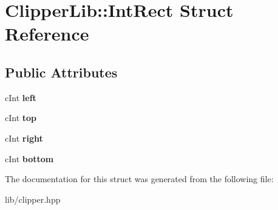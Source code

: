 \hypertarget{struct_clipper_lib_1_1_int_rect}{}\section{Clipper\+Lib\+:\+:Int\+Rect Struct Reference}
\label{struct_clipper_lib_1_1_int_rect}
\subsection*{Public Attributes}
\begin{DoxyCompactItemize}
\item 
\mbox{\label{struct_clipper_lib_1_1_int_rect_a9bf519994ffc7d1d5752fb1e2411b4cd}} 
c\+Int {\bfseries left}
\item 
\mbox{\label{struct_clipper_lib_1_1_int_rect_a07154695bf2313182400f829ba07c3a9}} 
c\+Int {\bfseries top}
\item 
\mbox{\label{struct_clipper_lib_1_1_int_rect_a28c68b5f806a88a187a53f3956954e74}} 
c\+Int {\bfseries right}
\item 
\mbox{\label{struct_clipper_lib_1_1_int_rect_a9da9418de5faa7eba55e8ee98a13ea0e}} 
c\+Int {\bfseries bottom}
\end{DoxyCompactItemize}


The documentation for this struct was generated from the following file\+:\begin{DoxyCompactItemize}
\item 
lib/clipper.\+hpp\end{DoxyCompactItemize}
